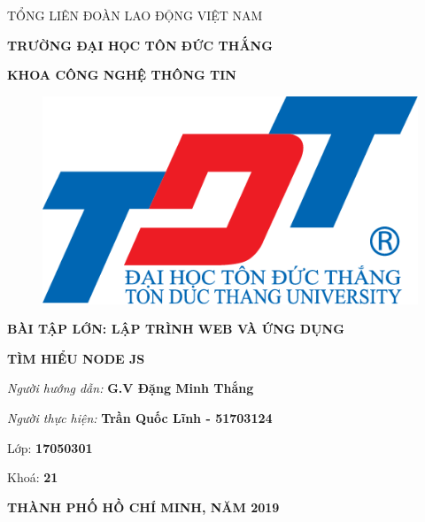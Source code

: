 \documentclass{report}
\begin{document}
\newcommand{\xfill}[2][1ex]{{%
  \dimen0=#2\advance\dimen0 by #1
  \leaders\hrule height \dimen0 depth -#1\hfill%
}}

\changefontsizes[14pt]{12pt}
\centerline{TỔNG LIÊN ĐOÀN LAO ĐỘNG VIỆT NAM}

\changefontsizes[14pt]{11pt}
\centerline{\textbf{TRƯỜNG ĐẠI HỌC TÔN ĐỨC THẮNG}}
\centerline{\textbf{KHOA CÔNG NGHỆ THÔNG TIN}}

\begin{center}
    \begin{figure}[htp]
    \begin{center}
     \includegraphics[scale=.2]{logo}
    \end{center}
    \end{figure}
\end{center}

\changefontsizes{16pt}
\centerline{\textbf{BÀI TẬP LỚN: LẬP TRÌNH WEB VÀ ỨNG DỤNG}}
\vspace{1.5cm}
\changefontsizes{24pt}
\centerline{\textbf{TÌM HIỂU NODE JS}}

\vspace{4cm}
\begin{flushright}
\renewcommand{\baselinestretch}{0.05}
\changefontsizes{14pt}
\textit{Người hướng dẫn: }\textbf{G.V Đặng Minh Thắng}
\setlength{\parskip}{0.5em}

\textit{Người thực hiện: }\textbf{Trần Quốc Lĩnh - 51703124}
\setlength{\parskip}{0.5em}

Lớp: \textbf{17050301}
\setlength{\parskip}{0.5em}

Khoá: \textbf{21}
\setlength{\parskip}{0.5em}

\end{flushright}

\vspace{1cm}
\changefontsizes{14pt}
\centerline{\textbf{THÀNH PHỐ HỒ CHÍ MINH, NĂM 2019}}
\end{document}
